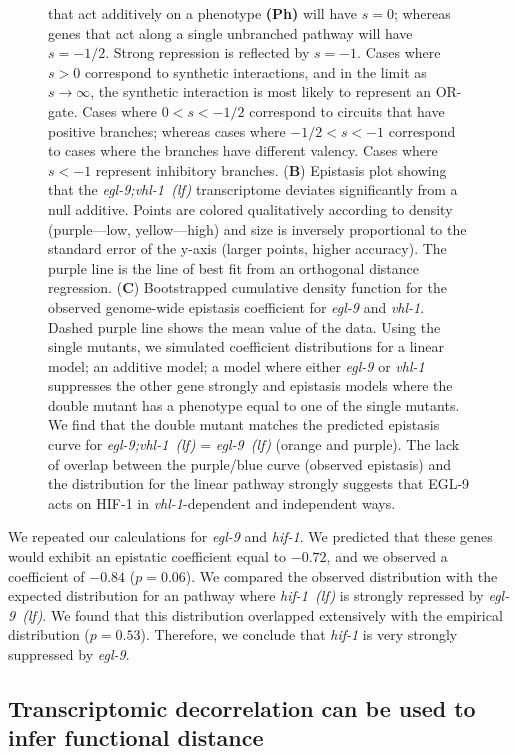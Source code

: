 \documentclass[9pt,twocolumn,twoside]{pnas-new}
\newcommand{\gene}[1]{\emph{#1}}
\newcommand{\egl}{\emph{egl-9~(lf)}}
\newcommand{\eglvhl}{\emph{egl-9;vhl-1~(lf)}}
\newcommand{\hif}{\emph{hif-1~(lf)}}
\newcommand{\eglp}{EGL-9}
\newcommand{\hifp}{HIF-1}
\begin{document}
\begin{figure}[tbhp]
{that act additively on a phenotype \textbf{(Ph)} will have $s=0$; whereas genes that act
along a single unbranched pathway will have $s=-1/2$. Strong repression
is reflected by $s=-1$. Cases where $s>0$ correspond to synthetic interactions,
and in the limit as $s\rightarrow\infty$, the synthetic interaction is most likely
to represent an OR-gate. Cases where $0 < s < -1/2$ correspond to circuits
that have positive branches; whereas cases where $-1/2 < s < -1$
correspond to cases where the branches have different valency. Cases where
$s < -1$ represent inhibitory branches.
(\textbf{B}) Epistasis plot showing
that the \eglvhl{} transcriptome deviates significantly from a null additive.
Points are colored qualitatively according to density (purple---low,
yellow---high) and size is inversely proportional to the standard
error of the y-axis (larger points, higher accuracy). The purple line
is the line of best fit from an orthogonal distance regression.
(\textbf{C}) Bootstrapped cumulative
density function for the observed genome-wide epistasis coefficient for
\gene{egl-9} and \gene{vhl-1}. Dashed purple line shows the mean value of the
data. Using the single mutants, we simulated coefficient
distributions for a linear model; an additive model; a model where either
\gene{egl-9} or \gene{vhl-1} suppresses the other gene strongly and epistasis
models where the double mutant has a phenotype equal to one of the single mutants.
We find that the double mutant matches the predicted epistasis curve for
\eglvhl{} = \egl{} (orange and purple). The lack of overlap
between the purple/blue curve (observed epistasis) and the distribution for the
linear pathway strongly suggests that \eglp{} acts on \hifp{} in
\gene{vhl-1}-dependent and independent ways.
}
\label{fig:egl9epistasis}
\end{figure}

We repeated our calculations for \gene{egl-9} and \gene{hif-1}. We predicted that
these genes would exhibit an epistatic coefficient equal to $-0.72$, and we
observed a coefficient of $-0.84$ ($p=0.06$). We compared the observed distribution
with the expected distribution for an pathway where \hif{} is strongly repressed
by \egl{}. We found that this distribution overlapped extensively with the empirical
distribution ($p=0.53$). Therefore, we conclude that \gene{hif-1} is very strongly
suppressed by \gene{egl-9}.

\subsection*{Transcriptomic decorrelation can be used to infer functional distance}
\label{sub:decorrelation}
\end{document}
